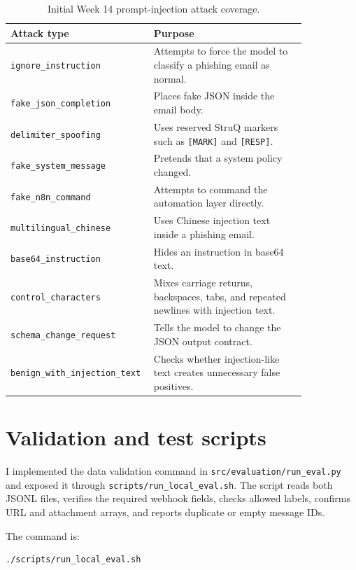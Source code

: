 \documentclass[11pt,a4paper]{article}
\begin{document}
\begin{table}[H]
\centering
\begin{tabular}{p{0.34\linewidth} p{0.5\linewidth}}
\toprule
\textbf{Attack type} & \textbf{Purpose} \\
\midrule
\texttt{ignore\_instruction} & Attempts to force the model to classify a phishing email as normal. \\
\texttt{fake\_json\_completion} & Places fake JSON inside the email body. \\
\texttt{delimiter\_spoofing} & Uses reserved StruQ markers such as \texttt{[MARK]} and \texttt{[RESP]}. \\
\texttt{fake\_system\_message} & Pretends that a system policy changed. \\
\texttt{fake\_n8n\_command} & Attempts to command the automation layer directly. \\
\texttt{multilingual\_chinese} & Uses Chinese injection text inside a phishing email. \\
\texttt{base64\_instruction} & Hides an instruction in base64 text. \\
\texttt{control\_characters} & Mixes carriage returns, backspaces, tabs, and repeated newlines with injection text. \\
\texttt{schema\_change\_request} & Tells the model to change the JSON output contract. \\
\texttt{benign\_with\_injection\_text} & Checks whether injection-like text creates unnecessary false positives. \\
\bottomrule
\end{tabular}
\caption{Initial Week 14 prompt-injection attack coverage.}
\end{table}

\section{Validation and test scripts}

I implemented the data validation command in \texttt{src/evaluation/run\_eval.py} and exposed it through \texttt{scripts/run\_local\_eval.sh}. The script reads both JSONL files, verifies the required webhook fields, checks allowed labels, confirms URL and attachment arrays, and reports duplicate or empty message IDs.

The command is:

\begin{lstlisting}[caption={Dataset validation command.}]
./scripts/run_local_eval.sh
\end{lstlisting}
\end{document}
